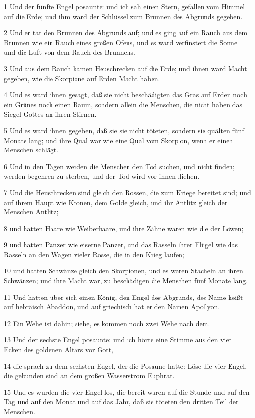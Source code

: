 \par 1 Und der fünfte Engel posaunte: und ich sah einen Stern, gefallen vom Himmel auf die Erde; und ihm ward der Schlüssel zum Brunnen des Abgrunds gegeben.
\par 2 Und er tat den Brunnen des Abgrunds auf; und es ging auf ein Rauch aus dem Brunnen wie ein Rauch eines großen Ofens, und es ward verfinstert die Sonne und die Luft von dem Rauch des Brunnens.
\par 3 Und aus dem Rauch kamen Heuschrecken auf die Erde; und ihnen ward Macht gegeben, wie die Skorpione auf Erden Macht haben.
\par 4 Und es ward ihnen gesagt, daß sie nicht beschädigten das Gras auf Erden noch ein Grünes noch einen Baum, sondern allein die Menschen, die nicht haben das Siegel Gottes an ihren Stirnen.
\par 5 Und es ward ihnen gegeben, daß sie sie nicht töteten, sondern sie quälten fünf Monate lang; und ihre Qual war wie eine Qual vom Skorpion, wenn er einen Menschen schlägt.
\par 6 Und in den Tagen werden die Menschen den Tod suchen, und nicht finden; werden begehren zu sterben, und der Tod wird vor ihnen fliehen.
\par 7 Und die Heuschrecken sind gleich den Rossen, die zum Kriege bereitet sind; und auf ihrem Haupt wie Kronen, dem Golde gleich, und ihr Antlitz gleich der Menschen Antlitz;
\par 8 und hatten Haare wie Weiberhaare, und ihre Zähne waren wie die der Löwen;
\par 9 und hatten Panzer wie eiserne Panzer, und das Rasseln ihrer Flügel wie das Rasseln an den Wagen vieler Rosse, die in den Krieg laufen;
\par 10 und hatten Schwänze gleich den Skorpionen, und es waren Stacheln an ihren Schwänzen; und ihre Macht war, zu beschädigen die Menschen fünf Monate lang.
\par 11 Und hatten über sich einen König, den Engel des Abgrunds, des Name heißt auf hebräisch Abaddon, und auf griechisch hat er den Namen Apollyon.
\par 12 Ein Wehe ist dahin; siehe, es kommen noch zwei Wehe nach dem.
\par 13 Und der sechste Engel posaunte: und ich hörte eine Stimme aus den vier Ecken des goldenen Altars vor Gott,
\par 14 die sprach zu dem sechsten Engel, der die Posaune hatte: Löse die vier Engel, die gebunden sind an dem großen Wasserstrom Euphrat.
\par 15 Und es wurden die vier Engel los, die bereit waren auf die Stunde und auf den Tag und auf den Monat und auf das Jahr, daß sie töteten den dritten Teil der Menschen.
